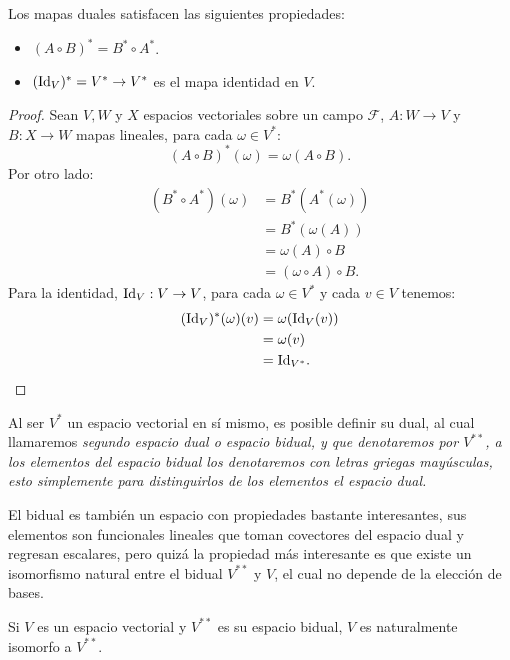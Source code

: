 \begin{lemma}
	Los mapas duales satisfacen las siguientes propiedades:
	\begin{itemize}
		\item $(A \circ B)^{*} = B^{*} \circ A^{*}$.
		\item $(\mathrm{Id}_V)^{*} = V^{*} \to V^{*}$ es el mapa identidad en $V$.
	\end{itemize}
\end{lemma}

\begin{proof}
	Sean $V,W$ y $X$ espacios vectoriales sobre un campo $\mathcal{F}$, $A: W \to V$ y $B: X \to W$ mapas lineales, para cada $\omega \in V^{*}$:
	\[ (A\circ B)^{*}(\omega) = \omega(A \circ B). \]
	Por otro lado:
	\begin{align*}
		(B^* \circ A^*)(\omega) & = B^{*}(A^*(\omega))        \\
		                        & = B^{*}(\omega(A))          \\
		                        & = \omega(A) \circ B         \\
		                        & = (\omega \circ A) \circ B.
	\end{align*}
	Para la identidad, $\mathrm{Id}_V: V \to V$, para cada $\omega \in V^{*}$ y cada $v \in V$ tenemos:
	\begin{align*}
		(\mathrm{Id}_V)^{*}(\omega)(v) & = \omega(\mathrm{Id}_V(v)) \\
		                       & = \omega(v)        \\
		                       & = \mathrm{Id}_{V^{*}}.
	\end{align*}
\end{proof}

Al ser $V^{*}$ un espacio vectorial en sí mismo, es posible definir su dual, al cual llamaremos \it{segundo espacio dual} o \it{espacio bidual}, y que denotaremos por $V^{**}$, a los elementos del espacio bidual los denotaremos con letras griegas mayúsculas, esto simplemente para distinguirlos de los elementos el espacio dual.

El bidual es también un espacio con propiedades bastante interesantes, sus elementos son funcionales lineales que toman covectores del espacio dual y regresan escalares, pero quizá la propiedad más interesante es que existe un isomorfismo natural entre el bidual $V^{**}$ y $V$, el cual no depende de la elección de bases.

\begin{theorem}
	Si $V$ es un espacio vectorial y $V^{**}$ es su espacio bidual, $V$ es naturalmente isomorfo a $V^{**}$.
\end{theorem}

